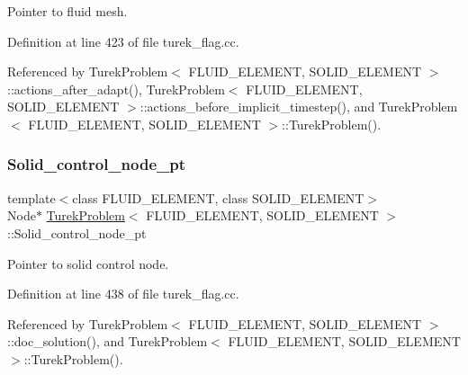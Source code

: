 Pointer to fluid mesh. 



Definition at line 423 of file turek\+\_\+flag.\+cc.



Referenced by Turek\+Problem$<$ F\+L\+U\+I\+D\+\_\+\+E\+L\+E\+M\+E\+N\+T, S\+O\+L\+I\+D\+\_\+\+E\+L\+E\+M\+E\+N\+T $>$\+::actions\+\_\+after\+\_\+adapt(), Turek\+Problem$<$ F\+L\+U\+I\+D\+\_\+\+E\+L\+E\+M\+E\+N\+T, S\+O\+L\+I\+D\+\_\+\+E\+L\+E\+M\+E\+N\+T $>$\+::actions\+\_\+before\+\_\+implicit\+\_\+timestep(), and Turek\+Problem$<$ F\+L\+U\+I\+D\+\_\+\+E\+L\+E\+M\+E\+N\+T, S\+O\+L\+I\+D\+\_\+\+E\+L\+E\+M\+E\+N\+T $>$\+::\+Turek\+Problem().

\mbox{\label{classTurekProblem_ad65b9a2f833ed9bae3520980c76d1f2f}} 
\subsubsection{\texorpdfstring{Solid\+\_\+control\+\_\+node\+\_\+pt}{Solid\_control\_node\_pt}}
{\footnotesize\ttfamily template$<$class F\+L\+U\+I\+D\+\_\+\+E\+L\+E\+M\+E\+NT, class S\+O\+L\+I\+D\+\_\+\+E\+L\+E\+M\+E\+NT$>$ \\
Node$\ast$ \hyperlink{classTurekProblem}{Turek\+Problem}$<$ F\+L\+U\+I\+D\+\_\+\+E\+L\+E\+M\+E\+NT, S\+O\+L\+I\+D\+\_\+\+E\+L\+E\+M\+E\+NT $>$\+::Solid\+\_\+control\+\_\+node\+\_\+pt\hspace{0.3cm}{\ttfamily [private]}}



Pointer to solid control node. 



Definition at line 438 of file turek\+\_\+flag.\+cc.



Referenced by Turek\+Problem$<$ F\+L\+U\+I\+D\+\_\+\+E\+L\+E\+M\+E\+N\+T, S\+O\+L\+I\+D\+\_\+\+E\+L\+E\+M\+E\+N\+T $>$\+::doc\+\_\+solution(), and Turek\+Problem$<$ F\+L\+U\+I\+D\+\_\+\+E\+L\+E\+M\+E\+N\+T, S\+O\+L\+I\+D\+\_\+\+E\+L\+E\+M\+E\+N\+T $>$\+::\+Turek\+Problem().

\mbox{\label{classTurekProblem_a1a449088ae3cc96ade1c58979294afed}} 
